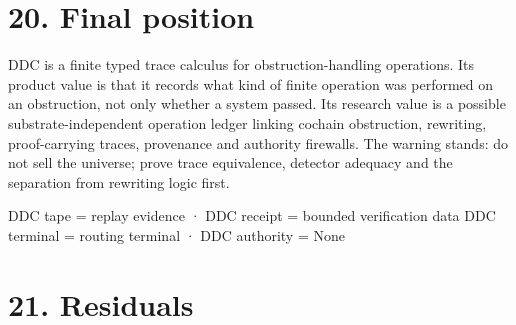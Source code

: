 \documentclass[
  11pt,
]{article}
\newenvironment{Shaded}{}{}
\newcommand{\NormalTok}[1]{#1}
\renewcommand{\_}{\ddcunderscore\allowbreak}
\begin{document}
\section{20. Final position}\label{final-position}

DDC is a finite typed trace calculus for obstruction-handling
operations. Its product value is that it records what kind of finite
operation was performed on an obstruction, not only whether a system
passed. Its research value is a possible substrate-independent operation
ledger linking cochain obstruction, rewriting, proof-carrying traces,
provenance and authority firewalls. The warning stands: do not sell the
universe; prove trace equivalence, detector adequacy and the separation
from rewriting logic first.

\begin{Shaded}
\begin{Highlighting}[]
\NormalTok{DDC tape = replay evidence · DDC receipt = bounded verification data}
\NormalTok{DDC terminal = routing terminal · DDC authority = None}
\end{Highlighting}
\end{Shaded}

\section{21. Residuals}\label{residuals}
\end{document}
